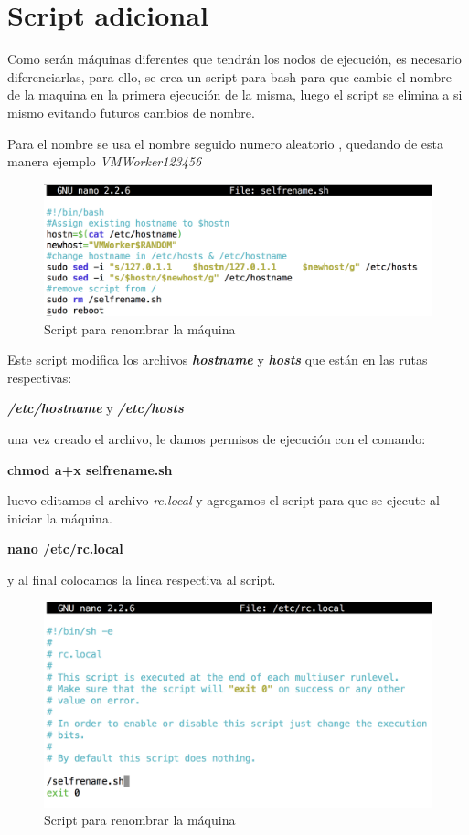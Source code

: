 \section{Script adicional}

Como serán máquinas diferentes que tendrán los nodos de ejecución, es necesario diferenciarlas, para ello, se crea un script para bash para que cambie el nombre de la maquina en la primera ejecución de la misma, luego el script se elimina a si mismo evitando futuros cambios de nombre.

Para el nombre se usa el nombre seguido numero aleatorio , quedando de esta manera ejemplo \textit{VMWorker123456}

\begin{figure}[h]
\centering
\includegraphics[width=1\textwidth]{Figures/scriptrename.png}
\decoRule
\caption{Script para renombrar la máquina }
\label{fig:rename script}
\end{figure}
\FloatBarrier

Este script modifica los archivos \textbf{\textit{hostname}} y \textbf{\textit{hosts}} que están en las rutas respectivas:

\textbf{\textit{/etc/hostname}} y \textbf{\textit{/etc/hosts}}

una vez creado el archivo, le damos permisos de ejecución con el comando:

\textbf{chmod a+x selfrename.sh}

luevo editamos el archivo \textit{rc.local} y agregamos el script para que se ejecute al iniciar la máquina.

\textbf{nano /etc/rc.local}

y al final colocamos la linea respectiva al script.

\begin{figure}[h]
\centering
\includegraphics[width=1\textwidth]{Figures/rclocal.png}
\decoRule
\caption{Script para renombrar la máquina }
\label{fig:rename script}
\end{figure}
\FloatBarrier





